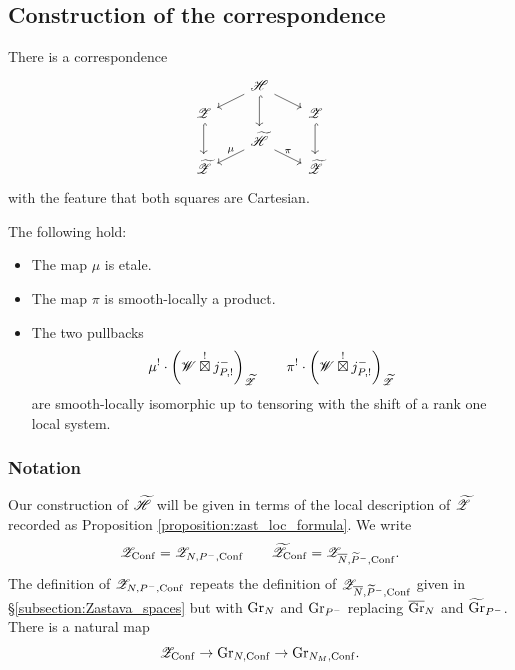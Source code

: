 \subsection{Construction of the correspondence}

\begin{construction} 
\label{construction:zast_correspondence}
There is a correspondence
\[
\begin{tikzcd}[
  column sep={4em,between origins},
  row sep={2em,between origins}
]
   & \HH \arrow[dd, hook] \arrow[dl] \arrow[dr] & \\
  \ZZ \arrow[dd, hook] &  & \ZZ \arrow[dd, hook] \\
   & \HHt \arrow[dl, "\mu" above] \arrow[dr, "\pi" above] & \\
  \ZZt & & \ZZt
\end{tikzcd}  
\]
with the feature that both squares are Cartesian.
\end{construction}

\begin{proposition}
\label{proposition:zast_corr}
The following hold:
\begin{itemize}
    \item[(i)] The map $\mu$ is etale. 
    \item[(ii)] The map $\pi$ is smooth-locally a product.
    \item[(ii)] The two pullbacks
      \[\mu^! \cdot \left(\mathscr{W} \overset{!}{\boxtimes} j_{P,!}^- \right)_{\widetilde{\mathscr{Z}}} \qquad \pi^! \cdot \left(\mathscr{W} \overset{!}{\boxtimes} j_{P,!}^- \right)_{\widetilde{\mathscr{Z}}}\]
    are smooth-locally isomorphic up to tensoring with the shift of a rank one local system.
\end{itemize}
\end{proposition}

\subsubsection{Notation} Our construction of $\widetilde{\mathscr{H}}$ will be given in terms of the local description of ${\widetilde{\mathscr{Z}}}$ recorded as Proposition \ref{proposition:zast_loc_formula}. We write
    \[
    \mathscr{Z}_{\mathrm{Conf}} = \mathscr{Z}_{N, P^-, \mathrm{Conf}}
    \qquad {\widetilde{\mathscr{Z}}}_{\mathrm{Conf}} = \mathscr{Z}_{\overline{N}, \widetilde{P}^-, \mathrm{Conf}}.
    \]
The definition of $\mathscr{Z}_{N, P^-, \mathrm{Conf}}$ repeats the definition of $\mathscr{Z}_{\overline{N}, \widetilde{P}^-, \mathrm{Conf}}$ given in \S\ref{subsection:Zastava_spaces} but with $\mathrm{Gr}_N$ and $\mathrm{Gr}_{P^-}$ replacing $\overline{\mathrm{Gr}}_N$ and $\widetilde{\mathrm{Gr}}_{P^-}$. There is a natural map
    \[\mathscr{Z}_{\mathrm{Conf}} \to \mathrm{Gr}_{N,\mathrm{Conf}} \to \mathrm{Gr}_{N_M, \mathrm{Conf}}.\]

